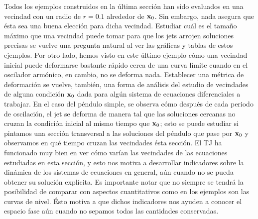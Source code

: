 Todos los ejemplos construidos en la última sección han sido evaluados en una vecindad con un radio de $r = 0.1$ alrededor de $\mathbf{x}_0$. Sin embargo, nada asegura que ésta sea una buena elección para dicha vecindad. Estudiar cuál es el tamaño máximo que una vecindad puede tomar para que los jets arrojen soluciones precisas se vuelve una pregunta natural al ver las gráficas y tablas de estos ejemplos. Por otro lado, hemos visto en este último ejemplo cómo una vecindad inicial puede deformarse bastante rápido cerca de una curva límite cuando en el oscilador armónico, en cambio, no se deforma nada. Establecer una métrica de deformación se vuelve, también, una forma de análisis del estudio de vecindades de alguna condición $\mathbf{x}_0$ dada para algún sistema de ecuaciones diferenciales a trabajar. En el caso del péndulo simple, se observa cómo después de cada periodo de oscilación, el jet se deforma de manera tal que las soluciones cercanas no cruzan la condición inicial al mismo tiempo que $\mathbf{x}_0$; esto se puede estudiar si pintamos una sección transversal a las soluciones del péndulo que pase por $\mathbf{x}_0$ y observamos en qué tiempo cruzan las vecindades ésta sección.  El TJ ha funcionado muy bien en ver cómo varían las vecindades de las ecuaciones estudiadas en esta sección, y esto nos motiva a desarrollar indicadores sobre la dinámica de los sistemas de ecuaciones en general, aún cuando no se pueda obtener su solución explícita. Es importante notar que no siempre se tendrá la posibilidad de comparar con aspectos cuantitativos como en los ejemplos son las curvas de nivel. Ésto motiva a que dichos indicadores nos ayuden a conocer el espacio fase aún cuando no sepamos todas las cantidades conservadas.

